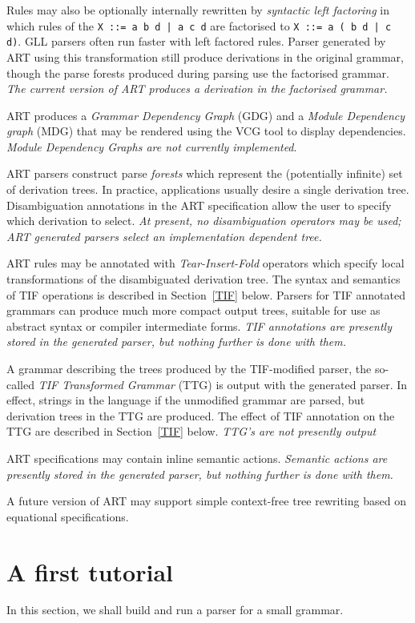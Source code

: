 \documentclass[11pt]{article}
\begin{document}
Rules may also be optionally internally rewritten by {\em syntactic
  left factoring} in which rules of the \verb+X ::= a b d | a c d+ are
factorised to \verb+X ::= a ( b d | c d)+. GLL parsers often run
faster with left factored rules. Parser generated by ART using this
transformation still produce derivations in the original grammar,
though the parse forests produced during parsing use the factorised
grammar. {\em The current version of ART produces a derivation in the
  factorised grammar.}

ART produces a {\em Grammar Dependency Graph} (GDG) and a {\em Module
  Dependency graph} (MDG) that may be rendered using the VCG tool to
display dependencies. {\em Module Dependency Graphs are not currently
  implemented}.

ART parsers construct parse {\em forests} which represent the
(potentially infinite) set of derivation trees. In practice,
applications usually desire a single derivation tree. Disambiguation
annotations in the ART specification allow the user to specify which
derivation to select. {\em At present, no disambiguation operators may
  be used; ART generated parsers select an implementation dependent
  tree.}

ART rules may be annotated with {\em Tear-Insert-Fold} operators which
specify local transformations of the disambiguated derivation
tree. The syntax and semantics of TIF operations is described in
Section~\ref{TIF} below. Parsers for TIF annotated grammars can
produce much more compact output trees, suitable for use as abstract
syntax or compiler intermediate forms.  {\em TIF annotations are
  presently stored in the generated parser, but nothing
  further is done with them.}

A grammar describing the trees produced by the TIF-modified parser,
the so-called {\em TIF Transformed Grammar} (TTG) is output with the
generated parser. In effect, strings in the language if the unmodified
grammar are parsed, but derivation trees in the TTG are produced. The
effect of TIF annotation on the TTG are described in Section~\ref{TIF}
below.  {\em TTG's are not presently output}

ART specifications may contain inline semantic actions. {\em Semantic
  actions are presently stored in the generated parser, but nothing
  further is done with them.}

A future version of ART may support simple context-free tree rewriting
based on equational specifications.


\section{A first tutorial}
In this section, we shall build and run a parser for a small grammar.
\end{document}
